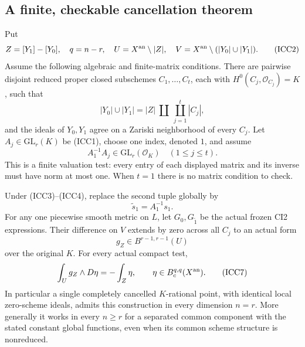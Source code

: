 \subsection{A finite, checkable cancellation theorem}

Put
\[
 Z=[Y_1]-[Y_0],\quad q=n-r,\quad
 U=X^{\rm an}\setminus|Z|,\quad
 V=X^{\rm an}\setminus(|Y_0|\cup|Y_1|).
 \tag{ICC2}
\]
Assume the following algebraic and finite-matrix conditions.
There are pairwise disjoint reduced proper closed subschemes
$C_1,\ldots,C_t$, each with $H^0(C_j,\mathcal O_{C_j})=K$,
such that
\[
 |Y_0|\cup|Y_1|=|Z|\ \amalg\ \coprod_{j=1}^t|C_j|,
 \tag{ICC3}
\]
and the ideals of $Y_0,Y_1$ agree on a Zariski neighborhood
of every $C_j$.  Let $A_j\in\mathrm{GL}_r(K)$ be (ICC1),
choose one index, denoted $1$, and assume
\[
                  A_1^{-1}A_j\in\mathrm{GL}_r(\mathcal O_K)
                              \quad(1\le j\le t).
 \tag{ICC4}
\]
This is a finite valuation test: every entry of each displayed
matrix and its inverse must have norm at most one.  When
$t=1$ there is no matrix condition to check.

\begin{theorem}
\label{thm:r9-isolated-ci-cancellation}
Under (ICC3)--(ICC4), replace the second tuple globally by
\[
                       \widetilde s_1=A_1^{-1}s_1.
 \tag{ICC5}
\]
For any one piecewise smooth metric on $L$, let
$G_0,G_{\widetilde1}$ be the actual frozen CI2 expressions.
Their difference on $V$ extends by zero across all $C_j$ to
an actual form
\[
                    g_Z\in B^{r-1,r-1}(U)
 \tag{ICC6}
\]
over the original $K$.  For every actual compact test,
\[
       \int_U g_Z\wedge D\eta=-\int_Z\eta,
                    \qquad\eta\in B_c^{q,q}(X^{\rm an}).
 \tag{ICC7}
\]
In particular a single completely cancelled $K$-rational
point, with identical local zero-scheme ideals, admits this
construction in every dimension $n=r$.  More generally it
works in every $n\ge r$ for a separated common component
with the stated constant global functions, even when its
common scheme structure is nonreduced.
\end{theorem}

